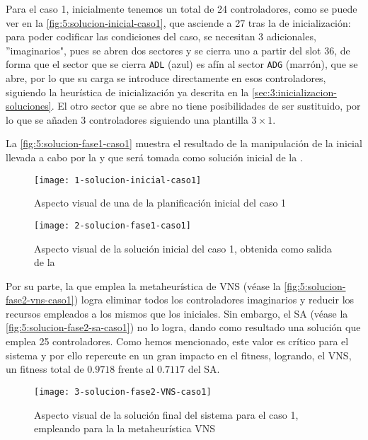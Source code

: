 Para el caso 1, inicialmente tenemos un total de 24 controladores, como se puede ver en la \autoref{fig:5:solucion-inicial-caso1}, que asciende a 27 tras la \faseuno{} de inicialización: para poder codificar las condiciones del caso, se necesitan 3 adicionales, ''imaginarios", pues se abren dos sectores y se cierra uno a partir del slot 36, de forma que el sector que se cierra \texttt{ADL} (azul) es afín al sector \texttt{ADG} (marrón), que se abre, por lo que su carga se introduce directamente en esos controladores, siguiendo la heurística de inicialización ya descrita en la \autoref{sec:3:inicializacion-soluciones}. El otro sector que se abre no tiene posibilidades de ser sustituido, por lo que se añaden 3 controladores siguiendo una plantilla $3\times1$.

La \autoref{fig:5:solucion-fase1-caso1} muestra el resultado de la manipulación de la inicial llevada a cabo por la \faseuno{} y que será tomada como solución inicial de la \fasedos{}.

\begin{figure}[htbp]
	\centering
	\texttt{[image: 1-solucion-inicial-caso1]}
	\caption{Aspecto visual de una de la planificación inicial del caso 1}
	\label{fig:5:solucion-inicial-caso1}
\end{figure}

\begin{figure}[htbp]
	\centering
	\texttt{[image: 2-solucion-fase1-caso1]}
	\caption{Aspecto visual de la solución inicial del caso 1, obtenida como salida de la \faseuno{}}
	\label{fig:5:solucion-fase1-caso1}
\end{figure}

Por su parte, la \fasedos{} que emplea la metaheurística de VNS (véase la \autoref{fig:5:solucion-fase2-vns-caso1}) logra eliminar todos los controladores imaginarios y reducir los recursos empleados a los mismos que los iniciales. Sin embargo, el SA (véase la \autoref{fig:5:solucion-fase2-sa-caso1}) no lo logra, dando como resultado una solución que emplea 25 controladores. Como hemos mencionado, este valor es crítico para el sistema y por ello repercute en un gran impacto en el fitness, logrando, el VNS, un fitness total de $0.9718$ frente al $0.7117$ del SA. 

\begin{figure}
	\centering
	\texttt{[image: 3-solucion-fase2-VNS-caso1]}
	\caption{Aspecto visual de la solución final del sistema para el caso 1, empleando para la \fasedos{} la metaheurística VNS}
	\label{fig:5:solucion-fase2-vns-caso1}
\end{figure}

